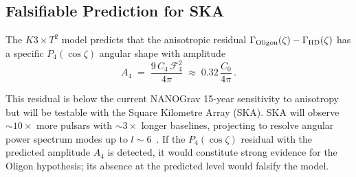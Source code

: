 \subsection{Falsifiable Prediction for SKA}

The $K3 \times T^2$ model predicts that the anisotropic residual $\Gamma_{\rm Oligon}(\zeta) - \Gamma_{\rm HD}(\zeta)$ has a specific $P_4(\cos\zeta)$ angular shape with amplitude
\begin{equation}
    A_4 \;=\; \frac{9\, C_4\, \mathcal{F}_4^2}{4\pi} \;\approx\; 0.32\, \frac{C_0}{4\pi}\,.
    \label{eq:residual_amplitude}
\end{equation}

This residual is below the current NANOGrav 15-year sensitivity to anisotropy but will be testable with the Square Kilometre Array (SKA).  SKA will observe $\sim\!10\times$ more pulsars with $\sim\!3\times$ longer baselines, projecting to resolve angular power spectrum modes up to $l \sim 6$~\cite{Taylor2022}.  If the $P_4(\cos\zeta)$ residual with the predicted amplitude $A_4$ is detected, it would constitute strong evidence for the Oligon hypothesis; its absence at the predicted level would falsify the model.
